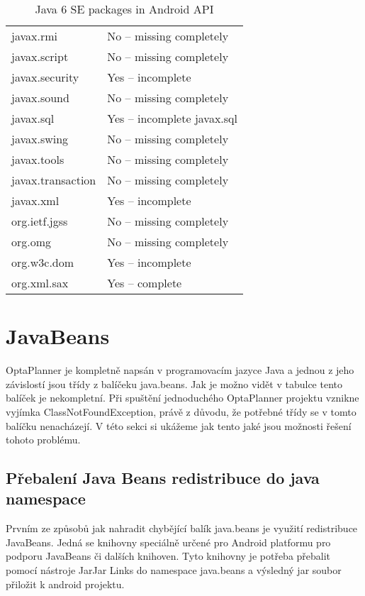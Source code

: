 \begin {table}[h!]
\begin{tabular}{|l|l|}
javax.rmi		        & No -- missing completely    \\
javax.script	        & No -- missing completely    \\
javax.security          & Yes -- incomplete            \\
javax.sound             & No -- missing completely    \\
javax.sql	            & Yes -- incomplete javax.sql  \\
javax.swing	            & No -- missing completely    \\
javax.tools	            & No -- missing completely    \\
javax.transaction	    & No -- missing completely    \\
javax.xml	            & Yes -- incomplete            \\
org.ietf.jgss	        & No -- missing completely    \\
org.omg                 & No -- missing completely    \\
org.w3c.dom             & Yes -- incomplete            \\
org.xml.sax	            & Yes -- complete              \\
\hline
\end{tabular}
\centering
\caption{Java 6 SE packages in Android API}
\end{table}

\section{JavaBeans}
OptaPlanner je kompletně napsán v programovacím jazyce Java a jednou z jeho závislostí jsou třídy z balíčeku java.beans. Jak je možno vidět v tabulce tento balíček je nekompletní. Při spuštění jednoduchého OptaPlanner projektu vznikne vyjímka ClassNotFoundException, právě z důvodu, že potřebné třídy se v tomto balíčku nenacházejí.   V této sekci si ukážeme jak tento jaké jsou možnosti řešení tohoto problému.

\subsection{Přebalení Java Beans redistribuce do java namespace}
Prvním ze způsobů jak nahradit chybějící balík java.beans je využití redistribuce JavaBeans. Jedná se knihovny speciálně určené pro Android platformu pro podporu JavaBeans či dalších knihoven. Tyto knihovny je potřeba přebalit pomocí nástroje JarJar Links do namespace java.beans a výsledný jar soubor přiložit k android projektu. 

